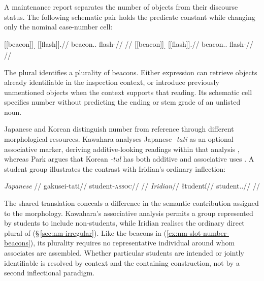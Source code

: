 A maintenance report separates the number of objects from their discourse
status. The following schematic pair holds the predicate constant while
changing only the nominal case-number cell:

\pex\label{ex:nm-slot-number-beacons}
\a
\begingl
\gla \textnormal{[[beacon]]}\textsubscript{\Dir{}.\Sg{}} \textnormal{[[flash]]}\textsubscript{\Prog{}}.//
\glb beacon.\Dir{}.\Sg{} flash-\Prog{}//
\glft {} //
\endgl
\a
\begingl
\gla \textnormal{[[beacon]]}\textsubscript{\Dir{}.\Pl{}} \textnormal{[[flash]]}\textsubscript{\Prog{}}.//
\glb beacon.\Dir{}.\Pl{} flash-\Prog{}//
\glft {} //
\endgl
\xe

The plural identifies a plurality of beacons. Either expression can retrieve
objects already identifiable in the inspection context, or introduce previously
unmentioned objects when the context supports that reading. Its schematic
cell specifies number without predicting the ending
or stem grade of an unlisted noun.

Japanese and Korean distinguish number from reference through different
morphological resources. Kawahara analyses Japanese \textit{-tati} as an
optional associative marker, deriving additive-looking readings within that
analysis \cite[§§\,3--4]{kawahara2025}, whereas Park argues that Korean
\textit{-tul} has both additive and associative uses \cite{park2023plural}.
A student group illustrates the contrast with Iridian's ordinary inflection:

\pex\label{ex:nm-comparative-students}
\a
\begingl
\glpreamble \textit{Japanese} \cite[example~3b; §4]{kawahara2025}//
\gla gakusei-tati//
\glb student-\textsc{assoc}//
\glft {}
//
\endgl
\a
\begingl
\glpreamble \textit{Iridian}//
\gla študentí//
\glb student.\Dir{}.\Pl{}//
\glft {}
//
\endgl
\xe

The shared translation conceals a difference in the semantic contribution
assigned to the morphology. Kawahara's associative analysis permits a
group represented by students to include non-students, while Iridian
 realises the ordinary direct plural of 
(§\,\ref{sec:nm-irregular}). Like the beacons in
(\ref{ex:nm-slot-number-beacons}), its plurality requires no representative
individual around whom associates are assembled. Whether particular students
are intended or jointly identifiable is resolved by context and the containing
construction, not by a second inflectional paradigm.

